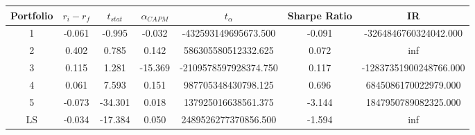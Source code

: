 \begin{tabular}{ccccccc}
\toprule
Portfolio &  $r_i - r_f$ &  $t_{stat}$ &  $\alpha_{CAPM}$ &          $t_{\alpha}$ &  Sharpe Ratio &                     IR \\
\midrule
        1 &       -0.061 &      -0.995 &           -0.032 &  -432593149695673.500 &        -0.091 &  -3264846760324042.000 \\
        2 &        0.402 &       0.785 &            0.142 &   586305580512332.625 &         0.072 &                    inf \\
        3 &        0.115 &       1.281 &          -15.369 & -2109578597928374.750 &         0.117 & -12837351900248766.000 \\
        4 &        0.061 &       7.593 &            0.151 &   987705348430798.125 &         0.696 &   6845086170022979.000 \\
        5 &       -0.073 &     -34.301 &            0.018 &   137925016638561.375 &        -3.144 &   1847950789082325.000 \\
       LS &       -0.034 &     -17.384 &            0.050 &  2489526277370856.500 &        -1.594 &                    inf \\
\bottomrule
\end{tabular}
